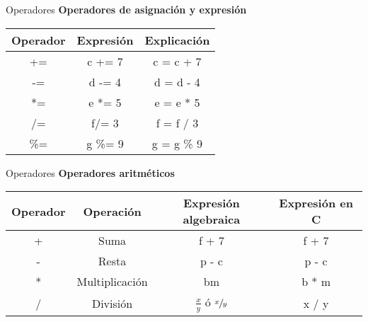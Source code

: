 \begin{frame}[t]{Operadores}
\textbf{Operadores de asignación y expresión}\\
\begin{center}
	\begin{tabular}{ccc}
		\toprule
		\textbf{Operador} & \textbf{Expresión} & \textbf{Explicación} \\
		\midrule
		+= & c += 7 & c = c + 7 \\ \hline
		-= & d -= 4 & d = d - 4 \\ \hline
		*= & e *= 5 & e = e * 5 \\ \hline
		/= & f/= 3 & f = f / 3 \\ \hline
		\hspace{1mm} \%= & g \%= 9 & g = g \% 9 \\
		\bottomrule
	\end{tabular}
\end{center}
\end{frame}

\begin{frame}[t]{Operadores}
\textbf{Operadores aritméticos}\\ \vspace{5mm}
\begin{center}
	\begin{tabular}{cccc}
		\toprule
		\textbf{Operador} & \textbf{Operación} & \textbf{Expresión algebraica} & \textbf{Expresión en C}\\
		\midrule
		+ & Suma & f + 7 & f + 7 \\ \hline
		- & Resta & p - c & p - c\\ \hline
		* & Multiplicación & bm & b * m\\ \hline
		/ & División & $\frac{x}{y}$ ó $\sfrac{x}{y}$ & x / y \\ \hline
	\end{tabular}
\end{center}
\end{frame}

